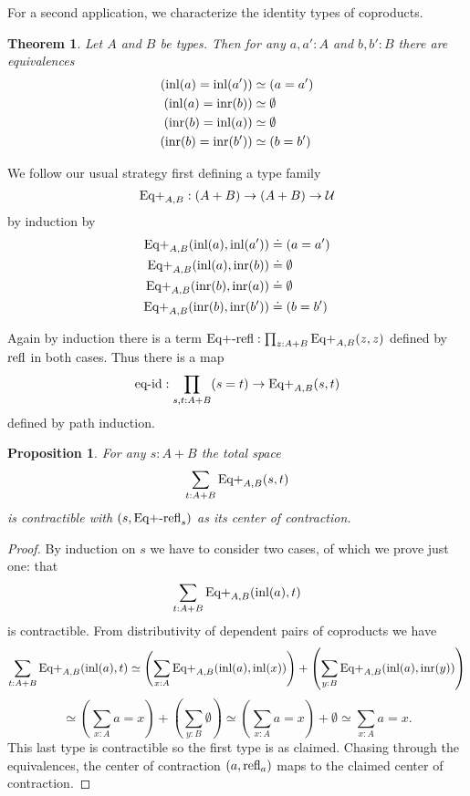 \documentclass{amsart}
\theoremstyle{theorem}
\newtheorem*{thm}{Theorem}
\newtheorem*{prop}{Proposition}
\theoremstyle{definition}
\theoremstyle{remark}
\newcommand{\0}{\mathbbe{0}}
\newcommand{\1}{\mathbbe{1}}
\newcommand{\2}{\mathbbe{2}}
\newcommand{\3}{\mathbbe{3}}
\newcommand{\4}{\mathbbe{4}}
\newcommand{\term}[1]{{\textup{#1}}}
\newcommand{\type}[1]{{\textup{#1}}}
\newcommand{\inl}{\term{inl}}
\newcommand{\inr}{\term{inr}}
\newcommand{\refl}{\term{refl}}
\newcommand{\UU}{{\mathcal{U}}}
\begin{document}
For a second application, we characterize the identity types of coproducts.

\begin{thm} Let $A$ and $B$ be types. Then for any $a,a' :A$ and $b,b': B$ there are equivalences
\begin{align*} (\inl(a) = \inl(a')) &\simeq (a = a')  \\ (\inl(a) = \inr(b)) &\simeq \emptyset \\ (\inr(b) = \inl(a)) &\simeq \emptyset \\ (\inr(b) = \inr(b')) &\simeq (b = b')
\end{align*}
\end{thm}

We follow our usual strategy first defining a type family
\[ \type{Eq+}_{A,B} : (A+B) \to (A+B) \to \UU\]
by induction by
\begin{align*} \type{Eq+}_{A,B}(\inl(a),\inl(a')) &\doteq (a = a')  \\ \type{Eq+}_{A,B}(\inl(a),\inr(b)) &\doteq \emptyset \\ \type{Eq+}_{A,B}(\inr(b),\inr(a)) &\doteq \emptyset \\ \type{Eq+}_{A,B} (\inr(b), \inr(b')) &\doteq (b = b')
\end{align*}

Again by induction there is a term $\term{Eq+-refl} : \prod_{z:A+B} \type{Eq+}_{A,B}(z,z)$ defined by $\refl$ in both cases. Thus there is a map
\[ \term{eq-id}: \prod_{s,t:A+B} (s=t) \to \type{Eq+}_{A,B}(s,t)\]
defined by path induction.

\begin{prop} For any $s : A +B$ the total space
\[ \sum_{t:A+B}\type{Eq+}_{A,B}(s,t)\]
is contractible with $(s, \term{Eq+-refl}_s)$ as its center of contraction.
\end{prop}
\begin{proof}
By induction on $s$ we have to consider two cases, of which we prove just one: that
\[ \sum_{t:A+B}\type{Eq+}_{A,B}(\inl(a),t)\]
is contractible. From distributivity of dependent pairs of coproducts we have
\[ \sum_{t:A+B}\type{Eq+}_{A,B}(\inl(a),t) \simeq \left(\sum_{x:A} \type{Eq+}_{A,B}(\inl(a),\inl(x)) \right)+ \left(\sum_{y:B} \type{Eq+}_{A,B}(\inl(a),\inr(y)) \right)\]\[\simeq \left(\sum_{x:A} a = x\right) + \left(\sum_{y:B} \emptyset\right) \simeq  \left(\sum_{x:A} a = x\right) + \emptyset \simeq  \sum_{x:A} a = x.  \]
This last type is contractible so the first type is as claimed. Chasing through the equivalences, the center of contraction $(a,\refl_a)$ maps to the claimed center of contraction.
\end{proof}
\end{document}
